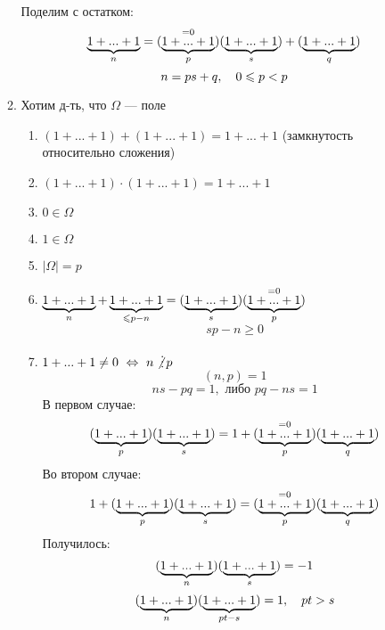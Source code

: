 \documentclass[main.tex]{subfiles}
\begin{document}
\begin{utv}
\begin{enumerate}
\begin{enumerate}
                        Поделим с остатком:
                        \[\ub{n}{1+...+1} = (\os{=0}{\ub{p}{1+...+1}})(\ub{s}{1+...+1})+(\ub{q}{1+...+1})\]
                        \[n = ps + q,\q 0 \leq p < p\]
                    \item Хотим д-ть, что $\Omega$ --- поле
                    \begin{enumerate}
                        \item $(1+...+1) + (1+...+1) = 1+...+1$ (замкнутость относительно сложения)
                        \item $(1+...+1) \cdot (1+...+1) = 1+...+1$
                        \item $0 \in \Omega$
                        \item $1 \in \Omega$
                        \item $|\Omega| = p$
                        \item $\ub{n}{1+...+1} + \ub{\leq p-n}{1+...+1} = (\ub{s}{1+...+1})(\os{=0}{\ub{p}{1+...+1}})$
                        \[sp - n \geq 0\]
                        \item $1+...+1 \neq 0\ \lra \ n \not \devides p$
                            \[(n,p) = 1\]
                            \[ns - pq = 1, \text{ либо } pq - ns = 1\]
                            В первом случае:
                            \[(\ub{p}{1+...+1})(\ub{s}{1+...+1}) = 1 + (\os{=0}{\ub{p}{1+...+1}})(\ub{q}{1+...+1})\]
                            Во втором случае:
                            \[1 + (\ub{p}{1+...+1})(\ub{s}{1+...+1}) = (\os{=0}{\ub{p}{1+...+1}})(\ub{q}{1+...+1})\]
                            Получилось:
                            \[(\ub{n}{1+...+1})(\ub{s}{1+...+1}) = -1\]
                            \[(\ub{n}{1+...+1})(\ub{pt-s}{1+...+1})=1,\q pt > s\]
                    \end{enumerate}
                \end{enumerate}
        \end{enumerate}
    \end{utv}
\end{document}
